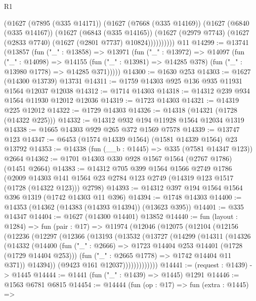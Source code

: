 \begin{lexlean}{R1}
\begin{coremodule}
          (@1627
            (@7895 (@335 @14171))
            (@1627
              (@7668 (@335 @14169))
              (@1627
                (@6840 (@335 @14167))
                (@1627
                  (@6843 (@335 @14165))
                  (@1627 (@2979 @7743) (@1627 (@2833 @7740) (@1627 (@2801 @7737) @10824))))))))))
    @11
@14299 := @13741
    (@13857
      (fun ("_" : @13858) =>
      @13971
        (fun ("_" : @13972) =>
        @14097
          (fun ("_" : @14098) =>
          @14155 (fun ("_" : @13981) => @14285 @378) (fun ("_" : @13980 @1778) => @14285 @371)))))
@14300 := @1630 @253
@14303 := @1627 (@14300 @13739) @13731
@14311 := @1759 @14303 @925 @136 @935 @11931 @1564 @12037 @12038
@14312 := @1714 @14303
@14318 := @14312 @239 @934 @1564 @11930 @12012 @12036
@14319 := @1723 @14303
@14321 := @14319 @225 @12012
@14322 := @1729 @14303
@14326 := @14318 (@14321 (@1728 (@14322 @225)))
@14332 := @14312 @932 @194 @11928 @1564 @12034 @1319
@14338 := @1665 @14303 @929 @265 @372 @1569 @7578
@14339 := @13747 @123
@14347 := @6453 (@1574 @14339 @1564) (@1581 @14339 @1564) @23 @13792
@14353 := @14338 (fun (__b : @1445) => @335 (@7581 @14347 @123)) @2664
@14362 := @1701 @14303 @330 @928 @1567 @1564 (@2767 @1786) (@1451 @2664)
@14383 := @14312
    @705
    @399
    @1564
    @1566
    @2749
    @1786
    (@2009 @14303 @141 @1564 @23 @2784 @123 @2749 (@14319 @123 @1517 (@1728 (@14322 @123))) @2798)
@14393 := @14312 @397 @194 @1564 @1564 @396 @1319 (@1742 @14303 @11 @396)
@14394 := @1748 @14303
@14400 := @14353 (@14362 (@14383 (@14393 @14394)) (@13623 @395))
@14401 := @335 @14347
@14404 := @1627 (@14300 @14401) @13852
@14440 := fun (layout : @1284) =>
  fun (pair : @17) =>
  @11974
    (@12046
      (@12075
        (@12104
          (@12156
            (@12236
              (@12297
                (@12366
                  (@13193
                    (@13532
                      (@13727
                        (@14299
                          (@14311
                            (@14326
                              (@14332
                                (@14400
                                  (fun ("_" : @2666) =>
                                  @1723 @14404 @253 @14401 (@1728 (@1729 @14404 @253)))
                                  (fun ("_" : @2665 @1778) => @1742 @14404 @11 @371))
                                @14394))
                            (@9423 @161 @12037)))))))))))))
@14441 := (request : @1439) -> @1445
@14444 := @1441 (fun ("_" : @1439) => @1445) @1291
@14446 := @1563 @6781 @6815
@14454 := @14444
    (fun (op : @17) =>
    fun (extra : @1445) =>

\end{coremodule}
\end{lexlean}
